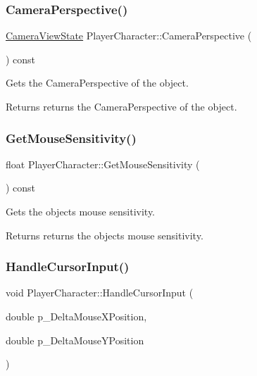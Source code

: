 \subsubsection{\texorpdfstring{CameraPerspective()}{CameraPerspective()}}
{\footnotesize\ttfamily \mbox{\hyperlink{_camera_view_state_8h_a63f3f328e010721669880ed43f58cabf}{Camera\+View\+State}} Player\+Character\+::\+Camera\+Perspective (\begin{DoxyParamCaption}{ }\end{DoxyParamCaption}) const\hspace{0.3cm}{\ttfamily [inline]}}



Gets the Camera\+Perspective of the object. 

\begin{DoxyReturn}{Returns}
returns the Camera\+Perspective of the object. 
\end{DoxyReturn}
\mbox{\label{class_player_character_a93e89332fa54a179bdb73d25df23a270}} 
\subsubsection{\texorpdfstring{GetMouseSensitivity()}{GetMouseSensitivity()}}
{\footnotesize\ttfamily float Player\+Character\+::\+Get\+Mouse\+Sensitivity (\begin{DoxyParamCaption}{ }\end{DoxyParamCaption}) const\hspace{0.3cm}{\ttfamily [inline]}}



Gets the object\textquotesingle{}s mouse sensitivity. 

\begin{DoxyReturn}{Returns}
returns the object\textquotesingle{}s mouse sensitivity. 
\end{DoxyReturn}
\mbox{\label{class_player_character_a6f60f1eec2f55e72a86ee5d1b1b3d361}} 
\subsubsection{\texorpdfstring{HandleCursorInput()}{HandleCursorInput()}}
{\footnotesize\ttfamily void Player\+Character\+::\+Handle\+Cursor\+Input (\begin{DoxyParamCaption}\item[{double}]{p\+\_\+\+Delta\+Mouse\+X\+Position,  }\item[{double}]{p\+\_\+\+Delta\+Mouse\+Y\+Position }\end{DoxyParamCaption})}



